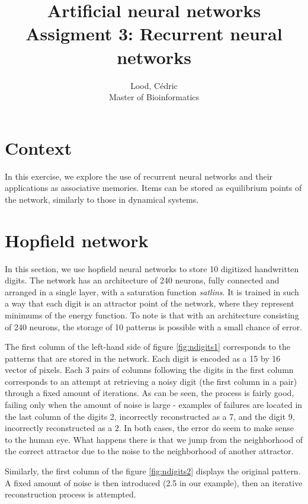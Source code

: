 \documentclass[11pt, a4paper]{article}
\title{ \huge Artificial neural networks \\ 
  { \large Assigment 3: Recurrent neural networks }}
\author{
        Lood, Cédric \\
        \small Master of Bioinformatics
}
\begin{document}
\maketitle

\section{Context}
In this exercise, we explore the use of recurrent neural networks and
their applications as associative memories. Items can be stored as
equilibrium points of the network, similarly to those in dynamical
systems.

\section{Hopfield network}

In this section, we use hopfield neural networks to store 10 digitized
handwritten digits. The network has an architecture of 240 neurons,
fully connected and arranged in a single layer, with a saturation
function \emph{satlins}. It is trained in such a way that each digit
is an attractor point of the network, where they represent minimums of
the energy function. To note is that with an architecture consisting
of 240 neurons, the storage of 10 patterns is possible with a small
chance of error.

The first column of the left-hand side of figure \ref{fig:ndigits1}
corresponds to the patterns that are stored in the network. Each digit
is encoded as a 15 by 16 vector of pixels. Each 3 pairs of columns
following the digits in the first column corresponds to an attempt at
retrieving a noisy digit (the first column in a pair) through a fixed
amount of iterations. As can be seen, the process is fairly good,
failing only when the amount of noise is large - examples of failures
are located in the last column of the digits 2, incorrectly
reconstructed as a 7, and the digit 9, incorrectly reconstructed as a
2. In both cases, the error do seem to make sense to the human
eye. What happens there is that we jump from the neighborhood of the
correct attractor due to the noise to the neighborhood of another
attractor.

Similarly, the first column of the figure \ref{fig:ndigits2} displays
the original pattern. A fixed amount of noise is then introduced (2.5
in our example), then an iterative reconstruction process is
attempted.
\end{document}
